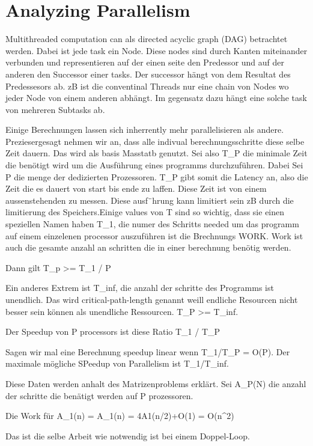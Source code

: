 \section{Analyzing Parallelism}

Multithreaded computation can als directed acyclic graph (DAG) betrachtet werden. Dabei ist jede task ein Node. Diese nodes sind durch Kanten miteinander verbunden und representieren auf der einen seite den Predessor und auf der anderen den Successor einer tasks. Der successor hängt von dem Resultat des Predessesors ab. zB ist die conventinal Threads nur eine chain von Nodes wo jeder Node von einem anderen abhängt. Im gegensatz dazu hängt eine solche task von mehreren Subtasks ab.

Einige Berechnungen lassen sich inherrently mehr parallelisieren als andere. Preziesergesagt nehmen wir an, dass alle indivual berechnungsschritte diese selbe Zeit dauern. Das wird als basis Masstatb genutzt. Sei also 
T_P 
die minimale Zeit die benötigt wird um die Ausführung eines programms durchzuführen. Dabei Sei P die menge der dedizierten Prozessoren. T_P gibt somit die Latency an, also die Zeit die es dauert von start bis ende zu laffen. Diese Zeit ist von einem aussenstehenden zu messen. Diese ausf¨hrung kann limitiert sein zB durch die limitierung des Speichers.Einige values von T sind so wichtig, dass sie einen speziellen Namen haben T_1, die numer des Schritts needed um das programm auf einem einzelenen processor auszuführen ist die Brechnungs WORK. Work ist auch die gesamte anzahl an schritten die in einer berechnung benötig werden. 

Dann gilt T_p >= T_1 / P

Ein anderes Extrem ist T_inf, die anzahl der schritte des Programms ist unendlich. Das wird critical-path-length genannt weill endliche Resourcen nicht besser sein können als unendliche Ressourcen. T_P >= T_inf.


Der Speedup von P processors ist diese Ratio T_1 / T_P


Sagen wir mal eine Berechnung speedup linear wenn T_1/T_P = O(P). Der maximale mögliche SPeedup von Parallelism ist T_1/T_inf. 

Diese Daten werden anhalt des Matrizenproblems erklärt. Sei A_P(N) die anzahl der schritte die benätigt werden auf P prozessoren. 


Die Work für A_1(n) = A_1(n) = 4A1(n/2)+O(1) = O(n^2)

Das ist die selbe Arbeit wie notwendig ist bei einem Doppel-Loop.


